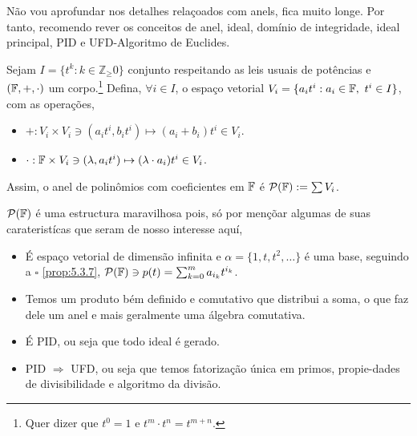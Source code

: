 Não vou aprofundar nos detalhes relaçoados com anels, fica muito longe. Por tanto, recomendo rever os conceitos de anel, ideal, domínio de integridade, ideal principal, PID e UFD-Algoritmo de Euclides. 
\begin{definition}
    Sejam \(I = \{t^k: k\in \mathbb{Z}_\geq0\}\) conjunto respeitando as leis usuais de potências e \((\mathbb{F},+,\cdot)\) um corpo.\footnote{Quer dizer que \(t^0 =1\) e \(t^m\cdot t^n=t^{m+n}\).  } Defina, \(\forall i \in I\), o espaço vetorial \(V_i = \{a_it^i: a_i \in \mathbb{F}, \  t^i \in I\}\), com as operações, 
    \begin{itemize}
        \item \(+: V_i \times V_i \ni (a_it^i , b_it^i) \mapsto (a_i+b_i)t^i \in V_i\). 
        \item \(\cdot: \mathbb{F} \times V_i \ni (\lambda, a_it^i) \mapsto (\lambda\cdot a_i) t^i \in V_i\). 
    \end{itemize} 
    Assim, o anel de polinômios com coeficientes em \(\mathbb{F}\) é \(\mathcal{P}(\mathbb{F}) := \sum V_i\).  
\end{definition}

\newcommand{\Pol}{\mathcal{P}(\F)}
\begin{note}
    \(\Pol\) é uma estructura maravilhosa pois, só por mençõar algumas de suas carateristícas que seram de nosso interesse aquí,  
    \begin{itemize}
        \item É espaço vetorial de dimensão infinita e \(\alpha = \{1, t, t^2, \ldots\}\) é uma base, seguindo a \(\square \) \ref{prop:5.3.7}, \(\Pol \ni p(t) = \sum^m_{k=0}a_{i_k}t^{i_k}\). 
        \item Temos um produto bém definido e comutativo que distribui a soma, o que faz dele um anel e mais geralmente uma álgebra comutativa.  
        \item É PID, ou seja que todo ideal é gerado. 
        \item PID \(\Rightarrow \) UFD, ou seja que temos fatorização única em primos, propie-dades de divisibilidade e algoritmo da divisão.
    \end{itemize}
\end{note}

